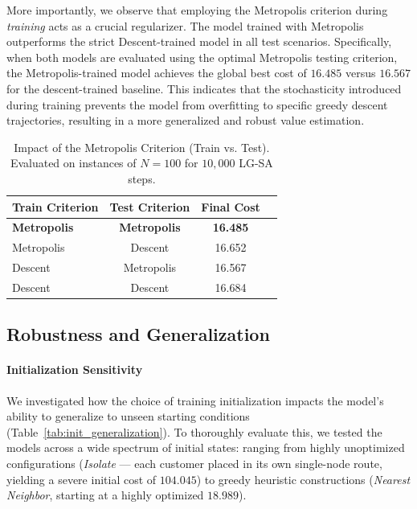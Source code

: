 \documentclass[letterpaper]{article} %
\begin{document}
More importantly, we observe that employing the Metropolis criterion during \textit{training} acts as a crucial regularizer. The model trained with Metropolis outperforms the strict Descent-trained model in all test scenarios. Specifically, when both models are evaluated using the optimal Metropolis testing criterion, the Metropolis-trained model achieves the global best cost of $16.485$ versus $16.567$ for the descent-trained baseline. This indicates that the stochasticity introduced during training prevents the model from overfitting to specific greedy descent trajectories, resulting in a more generalized and robust value estimation.

\begin{table}[t]
\centering
\small
\caption{Impact of the Metropolis Criterion (Train vs. Test). Evaluated on instances of $N=100$ for $10{,}000$ LG-SA steps.}
\label{tab:metropolis_ablation}
\begin{tabular}{l c c c}
\toprule
\textbf{Train Criterion} & \textbf{Test Criterion} & \textbf{Final Cost} \\
\midrule
\textbf{Metropolis} & \textbf{Metropolis} & \textbf{16.485} \\
Metropolis & Descent & 16.652 \\
\midrule
Descent & Metropolis & 16.567 \\
Descent & Descent  & 16.684 \\
\bottomrule
\end{tabular}
\end{table}

\subsection{Robustness and Generalization}

\paragraph{Initialization Sensitivity}
We investigated how the choice of training initialization impacts the model's ability to generalize to unseen starting conditions (Table~\ref{tab:init_generalization}). To thoroughly evaluate this, we tested the models across a wide spectrum of initial states: ranging from highly unoptimized configurations (\textit{Isolate} — each customer placed in its own single-node route, yielding a severe initial cost of $104.045$) to greedy heuristic constructions (\textit{Nearest Neighbor}, starting at a highly optimized $18.989$).
\end{document}
